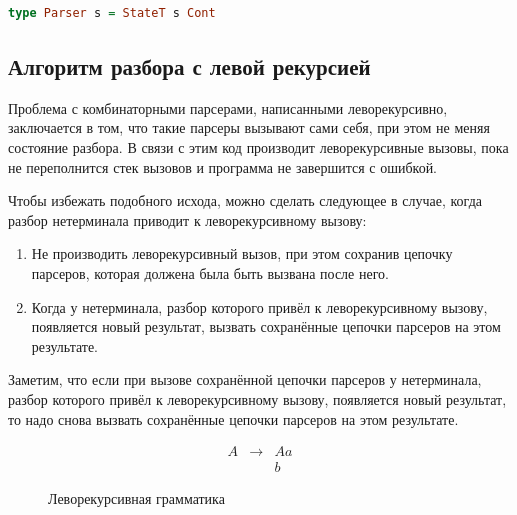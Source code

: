 \documentclass[times]{itmo-student-thesis}
\begin{document}
\begin{lstlisting}[language=Haskell,float=!h,caption={Парсер в CPS},label={lst:cps_parser}]
  type Parser s = StateT s Cont
\end{lstlisting}

\subsection{Алгоритм разбора с левой рекурсией}\label{sec:memoized_cps_parser}

Проблема с комбинаторными парсерами, написанными леворекурсивно, заключается в том, что такие парсеры вызывают сами
себя, при этом не меняя состояние разбора. В связи с этим код производит леворекурсивные вызовы, пока не переполнится стек 
вызовов и программа не завершится с ошибкой.

Чтобы избежать подобного исхода, можно сделать следующее в случае, когда разбор нетерминала приводит к леворекурсивному вызову:
\begin{enumerate}
    \item Не производить леворекурсивный вызов, при этом сохранив цепочку парсеров, которая должена была быть вызвана после него.
    \item Когда у нетерминала, разбор которого привёл к леворекурсивному вызову, появляется новый результат, вызвать сохранённые цепочки парсеров
          на этом результате.
\end{enumerate}
Заметим, что если при вызове сохранённой цепочки парсеров у нетерминала, разбор которого привёл к леворекурсивному вызову,
появляется новый результат, то надо снова вызвать сохранённые цепочки парсеров на этом результате. 

\begin{figure}[!h]
  \caption{Леворекурсивная грамматика}\label{leftrec_grammar_cps}
  \[
      \begin{array}{lll}
          A & \to & Aa \\
            &     & b
      \end{array}
  \]
\end{figure}
\end{document}
